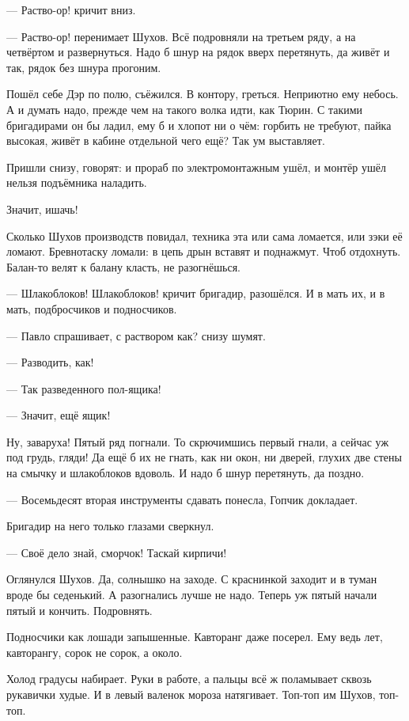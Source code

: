 --- Раство-ор! \dash кричит вниз.

--- Раство-ор! \dash перенимает Шухов. Всё подровняли на третьем ряду, а на четвёртом и
развернуться. Надо б шнур на рядок вверх перетянуть, да живёт и так, рядок без шнура прогоним.

Пошёл себе Дэр по полю, съёжился. В контору, греться. Неприютно ему небось. А и думать надо,
прежде чем на такого волка идти, как Тюрин. С такими бригадирами он бы ладил, ему б и хлопот ни
о чём: горбить не требуют, пайка высокая, живёт в кабине отдельной \dash чего ещё? Так ум
выставляет.

Пришли снизу, говорят: и прораб по электромонтажным ушёл, и монтёр ушёл \dash нельзя подъёмника
наладить.

Значит, ишачь!

Сколько Шухов производств повидал, техника эта или сама ломается, или зэки её ломают.
Бревнотаску ломали: в цепь дрын вставят и поднажмут. Чтоб отдохнуть. Балан-то велят к балану
класть, не разогнёшься.

--- Шлакоблоков! Шлакоблоков! \dash кричит бригадир, разошёлся. И в мать их, и в мать, подбросчиков
и подносчиков.

--- Павло спрашивает, с раствором как? \dash снизу шумят.

--- Разводить, как!

--- Так разведенного пол-ящика!

--- Значит, ещё ящик!

Ну, заваруха! Пятый ряд погнали. То скрючимшись первый гнали, а сейчас уж под грудь, гляди! Да
ещё б их не гнать, как ни окон, ни дверей, глухих две стены на смычку и шлакоблоков вдоволь. И
надо б шнур перетянуть, да поздно.

--- Восемьдесят вторая инструменты сдавать понесла, \dash Гопчик докладает.

Бригадир на него только глазами сверкнул.

--- Своё дело знай, сморчок! Таскай кирпичи!

Оглянулся Шухов. Да, солнышко на заходе. С краснинкой заходит и в туман вроде бы седенький. А
разогнались \dash лучше не надо. Теперь уж пятый начали \dash пятый и кончить. Подровнять.

Подносчики \dash как лошади запышенные. Кавторанг даже посерел. Ему ведь лет, кавторангу, сорок
не сорок, а около.

Холод градусы набирает. Руки в работе, а пальцы всё ж поламывает сквозь рукавички худые. И в
левый валенок мороза натягивает. Топ-топ им Шухов, топ-топ.

